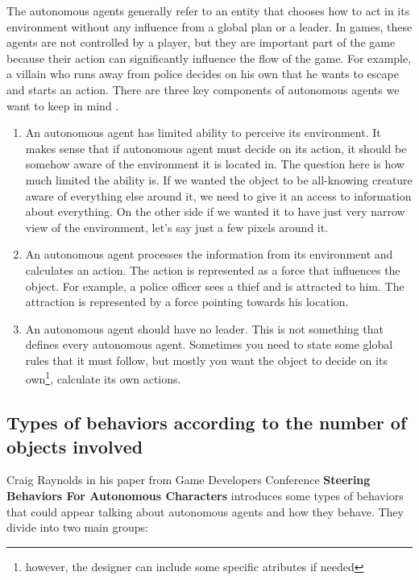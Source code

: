 \documentclass[10pt,twoside,english,a4paper]{article}
\begin{document}
The autonomous agents generally refer to an entity that chooses how to act in its environment without any influence from a global plan or a leader. In games, these agents are not controlled by a player, but they are important part of the game because their action can significantly influence the flow of the game. For example, a villain who runs away from police decides on his own that he wants to escape and starts an action. There are three key components of autonomous agents we want to keep in mind \cite{Verhagen}. 

\begin{enumerate}
\item An autonomous agent has limited ability to perceive its environment. It makes sense that if autonomous agent must decide on its action, it should be somehow aware of the environment it is located in. The question here is how much limited the ability is. If we wanted the object to be all-knowing creature aware of everything else around it, we need to give it an access to information about everything. On the other side if we wanted it to have just very narrow view of the environment, let’s say just a few pixels around it.

\item An autonomous agent processes the information from its environment and calculates an action. The action is represented as a force that influences the object. For example, a police officer sees a thief and is attracted to him. The attraction is represented by a force pointing towards his location. 

\item An autonomous agent should have no leader. This is not something that defines every autonomous agent. Sometimes you need to state some global rules that it must follow, but mostly you want the object to decide on its own\footnote{however, the designer can include some specific atributes if needed}, calculate its own actions.

\end{enumerate}

\subsection{Types of behaviors according to the number of objects involved} \label{types of behaviors}

Craig Raynolds in his paper from Game Developers Conference \textbf{Steering Behaviors For Autonomous Characters} \cite{Raynolds} introduces some types of behaviors that could appear talking about autonomous agents and how they behave. They divide into two main groups:
\end{document}
